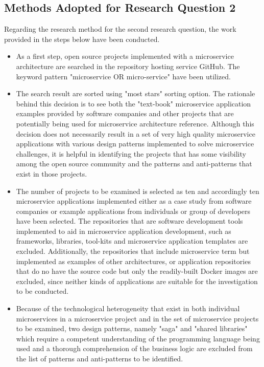 \documentclass{Configuration_Files/PoliMi3i_thesis}
\begin{document}
\subsection{Methods Adopted for Research Question 2}
\label{subsec:adopted_method_RQ2}

Regarding the research method for the second research question, the work provided in the steps below have been conducted.

\begin{itemize}
    \item As a first step, open source projects implemented with a microservice architecture are searched in the repository hosting service GitHub.
    The keyword pattern "microservice OR micro-service" have been utilized.

    \item The search result are sorted using "most stars" sorting option.
    The rationale behind this decision is to see both the "text-book" microservice application examples provided by software companies and other projects that are potentially being used for microservice architecture reference.
    Although this decision does not necessarily result in a set of very high quality microservice applications with various design patterns implemented to solve microservice challenges, it is helpful in identifying the projects that has some visibility among the open source community and the patterns and anti-patterns that exist in those projects.
    
    \item The number of projects to be examined is selected as ten and accordingly ten microservice applications implemented either as a case study from software companies or example applications from individuals or group of developers have been selected.
    The repositories that are software development tools implemented to aid in microservice application development, such as frameworks, libraries, tool-kits and microservice application templates are excluded.
    Additionally, the repositories that include microservice term but implemented as examples of other architectures, or application repositories that do no have the source code but only the readily-built Docker images are excluded, since neither kinds of applications are suitable for the investigation to be conducted.
    
    \item Because of the technological heterogeneity that exist in both individual microservices in a microservice project and in the set of microservice projects to be examined, two design patterns, namely "saga" and "shared libraries" which require a competent understanding of the programming language being used and a thorough comprehension of the business logic are excluded from the list of patterns and anti-patterns to be identified.
    

\end{itemize}
\end{document}
